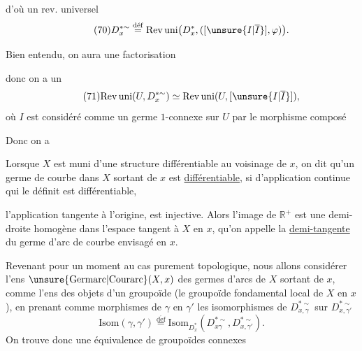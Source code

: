 d'où un rev. universel
\[
\tag{70}
D_x^{*\sim}\overset{\mathrm{d\acute ef}}{=}
\mathrm{Rev\,uni}\bigl(D_x^*,([\unsure{I|\overline I}],\varphi)\bigr).
\]

Bien entendu, on aura une factorisation

donc on a un 
\[
\tag{71}
\mathrm{Rev\,uni}(U,D_x^{*\sim})\simeq
\mathrm{Rev\,uni}(U,[\unsure{I|\overline I}]),
\]
où $I$ est considéré comme un germe $1$-connexe sur $U$ par le morphisme composé

Donc on a

Lorsque $X$ est muni d'une structure différentiable au voisinage de $x$, on dit qu'un germe de courbe dans $X$ sortant de $x$ est \uline{différentiable}, si   d'application continue
qui le définit est différentiable, 

l'application tangente à l'origine, 
est injective. Alors l'image de $\mathbb R^+$ est une demi-droite homogène dans l'espace tangent à $X$ en $x$, qu'on appelle la \uline{demi-tangente} du germe d'arc de courbe envisagé en $x$.

Revenant pour un moment au cas purement topologique, nous allons considérer l'ens $\unsure{\mathrm{Germarc}|\mathrm{Courarc}}(X,x)$ des germes d'arcs de $X$ sortant de $x$, comme l'ens des objets d'un groupoïde (le groupoïde fondamental local de $X$ en $x$), en prenant comme morphismes de $\gamma$ en $\gamma'$  les isomorphismes de  $D_{x,\gamma}^{*\sim}$ sur $D_{x,\gamma'}^{*\sim}$
\[
\tag{74}
\mathrm{Isom}(\gamma,\gamma')\overset{\mathrm{d\acute ef}}{=}
\mathrm{Isom}_{D_x^*}(D_{x\gamma}^{*\sim},D_{x,\gamma'}^{*\sim}).
\]
On trouve donc  une équivalence de  groupoïdes connexes

